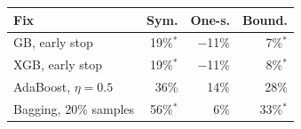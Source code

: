 \begin{tabular}{@{}lrrr@{}}
\toprule
Fix & Sym. & One-s. & Bound. \\
\midrule
GB, early stop & 19\%$^{*}$ & $-$11\% & 7\%$^{*}$ \\
XGB, early stop & 19\%$^{*}$ & $-$11\% & 8\%$^{*}$ \\
AdaBoost, $\eta{=}0.5$ & 36\% & 14\% & 28\% \\
Bagging, 20\% samples & 56\%$^{*}$ & 6\% & 33\%$^{*}$ \\
\bottomrule
\end{tabular}